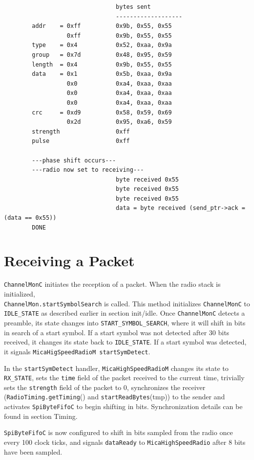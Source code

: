 \documentclass[11pt]{article}
\begin{document}
\begin{verbatim}
                                bytes sent
                                -------------------
        addr    = 0xff          0x9b, 0x55, 0x55
                  0xff          0x9b, 0x55, 0x55
        type    = 0x4           0x52, 0xaa, 0x9a
        group   = 0x7d          0x48, 0x95, 0x59
        length  = 0x4           0x9b, 0x55, 0x55
        data    = 0x1           0x5b, 0xaa, 0x9a
                  0x0           0xa4, 0xaa, 0xaa
                  0x0           0xa4, 0xaa, 0xaa
                  0x0           0xa4, 0xaa, 0xaa
        crc     = 0xd9          0x58, 0x59, 0x69
                  0x2d          0x95, 0xa6, 0x59
        strength                0xff
        pulse                   0xff

        ---phase shift occurs---
        ---radio now set to receiving---
                                byte received 0x55
                                byte received 0x55	
                                byte received 0x55
                                data = byte received (send_ptr->ack = (data == 0x55))
        DONE
\end{verbatim}


\section*{Receiving a Packet}
{\tt ChannelMonC} initiates the reception of a packet. When the radio stack
is initialized, \\
{\tt ChannelMon.startSymbolSearch} is called. This method
initializes {\tt ChannelMonC} to {\tt IDLE\_STATE} as described earlier in section
init/idle. Once {\tt ChannelMonC} detects a preamble, its state changes into
{\tt START\_SYMBOL\_SEARCH}, where it will shift in bits in search of a start
symbol. If a start symbol was not detected after 30 bits received, it
changes its state back to {\tt IDLE\_STATE}. If a start symbol was detected,
it signals {\tt MicaHigSpeedRadioM startSymDetect}.

In the {\tt startSymDetect} handler, {\tt MicaHighSpeedRadioM} changes its state
to {\tt RX\_STATE}, sets the {\tt time} field of the packet received to the current
time, trivially sets the {\tt strength} field of the packet to 0,
synchronizes the receiver ({\tt RadioTiming.getTiming}() and {\tt startReadBytes}(tmp)) to the sender and activates {\tt SpiByteFifoC} to
begin shifting in bits. Synchronization details can be found in
section Timing. 

{\tt SpiByteFifoC} is now configured to shift in bits sampled from the radio
once every 100 clock ticks, and signals {\tt dataReady} to
{\tt MicaHighSpeedRadio} after 8 bits have been sampled.
\end{document}
